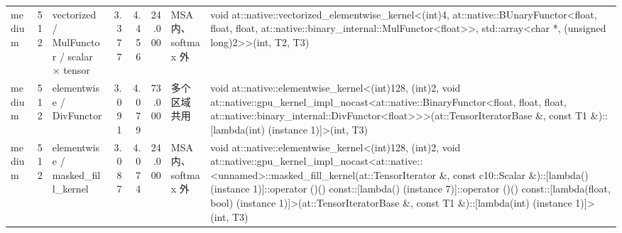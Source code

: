 \begin{tabular}{lrlrrrll}
medium & 512 & vectorized / MulFunctor / scalar × tensor & 3.377 & 4.456 & 24.000 & MSA 内、softmax 外 & void at::native::vectorized\_elementwise\_kernel<(int)4, at::native::BUnaryFunctor<float, float, float, at::native::binary\_internal::MulFunctor<float>>, std::array<char *, (unsigned long)2>>(int, T2, T3) \\
medium & 512 & elementwise / DivFunctor & 3.091 & 4.079 & 73.000 & 多个区域共用 & void at::native::elementwise\_kernel<(int)128, (int)2, void at::native::gpu\_kernel\_impl\_nocast<at::native::BinaryFunctor<float, float, float, at::native::binary\_internal::DivFunctor<float>>>(at::TensorIteratorBase \&, const T1 \&)::[lambda(int) (instance 1)]>(int, T3) \\
medium & 512 & elementwise / masked\_fill\_kernel & 3.087 & 4.074 & 24.000 & MSA 内、softmax 外 & void at::native::elementwise\_kernel<(int)128, (int)2, void at::native::gpu\_kernel\_impl\_nocast<at::native::<unnamed>::masked\_fill\_kernel(at::TensorIterator \&, const c10::Scalar \&)::[lambda() (instance 1)]::operator ()() const::[lambda() (instance 7)]::operator ()() const::[lambda(float, bool) (instance 1)]>(at::TensorIteratorBase \&, const T1 \&)::[lambda(int) (instance 1)]>(int, T3) \\
\bottomrule
\end{tabular}
